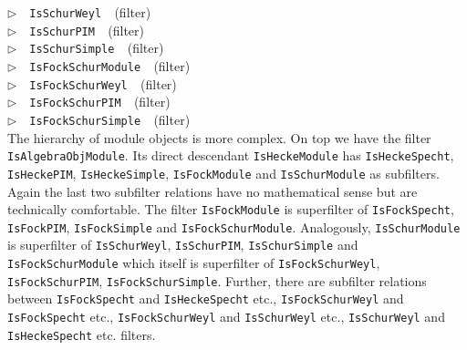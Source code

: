 \documentclass[a4paper,11pt]{report}
\begin{document}
{{{\noindent\textcolor{FuncColor}{$\triangleright$\ \ \texttt{IsSchurWeyl
\label{IsSchurWeyl}
}\hfill{\scriptsize (filter)}}\\
\noindent\textcolor{FuncColor}{$\triangleright$\ \ \texttt{IsSchurPIM
\label{IsSchurPIM}
}\hfill{\scriptsize (filter)}}\\
\noindent\textcolor{FuncColor}{$\triangleright$\ \ \texttt{IsSchurSimple
\label{IsSchurSimple}
}\hfill{\scriptsize (filter)}}\\
\noindent\textcolor{FuncColor}{$\triangleright$\ \ \texttt{IsFockSchurModule
\label{IsFockSchurModule}
}\hfill{\scriptsize (filter)}}\\
\noindent\textcolor{FuncColor}{$\triangleright$\ \ \texttt{IsFockSchurWeyl
\label{IsFockSchurWeyl}
}\hfill{\scriptsize (filter)}}\\
\noindent\textcolor{FuncColor}{$\triangleright$\ \ \texttt{IsFockSchurPIM
\label{IsFockSchurPIM}
}\hfill{\scriptsize (filter)}}\\
\noindent\textcolor{FuncColor}{$\triangleright$\ \ \texttt{IsFockSchurSimple
\label{IsFockSchurSimple}
}\hfill{\scriptsize (filter)}}\\


 The hierarchy of module objects is more complex. On top we have the filter \texttt{IsAlgebraObjModule}. Its direct descendant \texttt{IsHeckeModule} has \texttt{IsHeckeSpecht}, \texttt{IsHeckePIM}, \texttt{IsHeckeSimple}, \texttt{IsFockModule} and \texttt{IsSchurModule} as subfilters. Again the last two subfilter relations have no mathematical
sense but are technically comfortable. The filter \texttt{IsFockModule} is superfilter of \texttt{IsFockSpecht}, \texttt{IsFockPIM}, \texttt{IsFockSimple} and \texttt{IsFockSchurModule}. Analogously, \texttt{IsSchurModule} is superfilter of \texttt{IsSchurWeyl}, \texttt{IsSchurPIM}, \texttt{IsSchurSimple} and \texttt{IsFockSchurModule} which itself is superfilter of \texttt{IsFockSchurWeyl}, \texttt{IsFockSchurPIM}, \texttt{IsFockSchurSimple}. Further, there are subfilter relations between \texttt{IsFockSpecht} and \texttt{IsHeckeSpecht} etc., \texttt{IsFockSchurWeyl} and \texttt{IsFockSpecht} etc., \texttt{IsFockSchurWeyl} and \texttt{IsSchurWeyl} etc., \texttt{IsSchurWeyl} and \texttt{IsHeckeSpecht} etc. filters.

}}}
\end{document}
